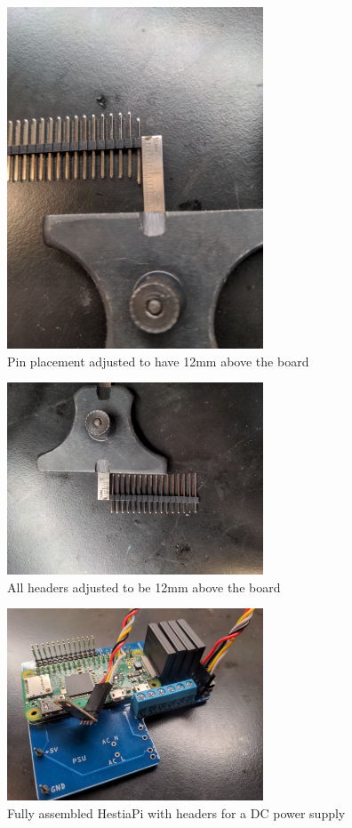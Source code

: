 \begin{figure}
  \centering
  \includegraphics[width=3in]{img/modified_header.jpg}
  \caption{Pin placement adjusted to have 12mm above the board}
  \label{fig:header}
\end{figure}
\begin{figure}
  \centering
  \includegraphics[width=3in]{img/modified_headers.jpg}
  \caption{All headers adjusted to be 12mm above the board}
  \label{fig:headers}
\end{figure}
\begin{figure}
  \centering
  \includegraphics[width=3in]{img/fully_assembled.jpg}
  \caption{Fully assembled HestiaPi with headers for a DC power supply}
  \label{fig:fully_assembled}
\end{figure}


